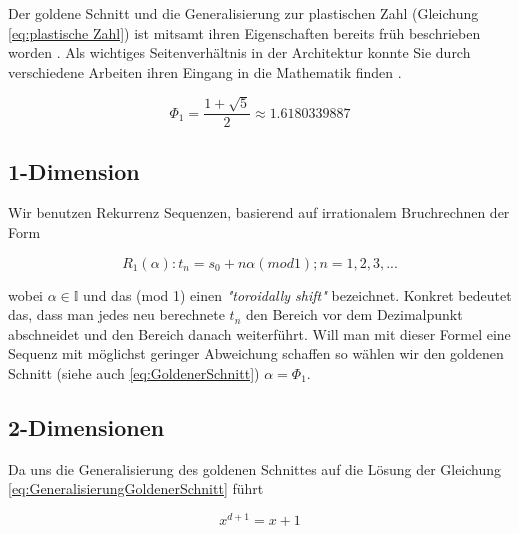 Der goldene Schnitt und die Generalisierung zur plastischen Zahl (Gleichung \ref{eq:plastische Zahl})
ist mitsamt ihren Eigenschaften bereits früh beschrieben worden \cite{vanderlaanplasticnumber}.
Als wichtiges Seitenverhältnis in der Architektur konnte Sie durch verschiedene Arbeiten ihren 
Eingang in die Mathematik finden \cite{krcadinac2006new}.

\begin{tcolorbox}[rightrule=3mm, rounded corners=east]
    \begin{equation}\label{eq:GoldenerSchnitt}
        \Phi_{1} = \frac{1 + \sqrt{5}}{2} \approx 1.6180339887
    \end{equation}
\end{tcolorbox}

\label{subsec:1-Dimension}
\subsection{1-Dimension}
Wir benutzen Rekurrenz Sequenzen, basierend auf irrationalem 
Bruchrechnen der Form

\begin{tcolorbox}[rightrule=3mm, rounded corners=east]
    \begin{equation}\label{eq:Rekurrenz Sequenz}
        R_{1}(\alpha) : t_n = s_0 + n\alpha(mod 1); n = 1,2,3,...
    \end{equation}
\end{tcolorbox}

wobei $\alpha \in \mathbb{I}$ und das (mod 1) einen \textit{"toroidally shift"}
bezeichnet. Konkret bedeutet das, dass man jedes neu berechnete $t_{n}$ den Bereich vor dem Dezimalpunkt abschneidet 
und den Bereich danach weiterführt. Will man mit dieser Formel eine Sequenz mit möglichst geringer
Abweichung schaffen so wählen wir den goldenen Schnitt (siehe auch \ref{eq:GoldenerSchnitt})
$\alpha = \Phi_{1}$.

\label{subsec:2-Dimensionen}
\subsection{2-Dimensionen}

Da uns die Generalisierung des goldenen Schnittes auf die Lösung der Gleichung
\ref{eq:GeneralisierungGoldenerSchnitt} führt

\begin{tcolorbox}[rightrule=3mm, rounded corners=east]
    \begin{equation}\label{eq:GeneralisierungGoldenerSchnitt}
        x^{d+1} = x+1
    \end{equation}
\end{tcolorbox}

